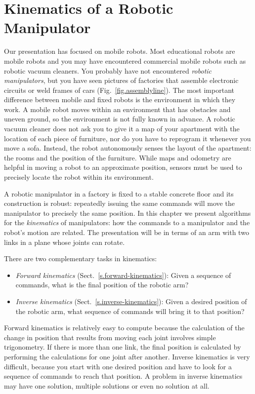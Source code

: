 
\chapter{Kinematics of a Robotic Manipulator}\label{ch.kinematics}

Our presentation has focused on mobile robots. Most educational robots are mobile robots and you may have encountered commercial mobile robots such as robotic vacuum cleaners. You probably have not encountered \emph{robotic manipulators}, but you have seen pictures of factories that assemble electronic circuits or weld frames of cars (Fig.~\ref{fig.assemblyline}). The most important difference between mobile and fixed robots is the environment in which they work. A mobile robot moves within an environment that has obstacles and uneven ground, so the environment is not fully known in advance. A robotic vacuum cleaner does not ask you to give it a map of your apartment with the location of each piece of furniture, nor do you have to reprogram it whenever you move a sofa. Instead, the robot autonomously senses the layout of the apartment: the rooms and the position of the furniture. While maps and odometry are helpful in moving a robot to an approximate position, sensors must be used to precisely locate the robot within its environment.

A robotic manipulator in a factory is fixed to a stable concrete floor and its construction is robust: repeatedly issuing the same commands will move the manipulator to precisely the same position. In this chapter we present algorithms for the \emph{kinematics} of manipulators: how the commands to a manipulator and the robot's motion are related. The presentation will be in terms of an arm with two links in a plane whose joints can rotate.

There are two complementary tasks in kinematics:
\begin{itemize}
\item \textit{Forward kinematics} (Sect.~\ref{s.forward-kinematics}): Given a sequence of commands, what is the final position of the robotic arm?
\item \textit{Inverse kinematics}  (Sect.~\ref{s.inverse-kinematics}): Given a desired position of the robotic arm, what sequence of commands will bring it to that position?
\end{itemize}

Forward kinematics is relatively easy to compute because the calculation of the change in position that results from moving each joint involves simple trigonometry. If there is more than one link, the final position is calculated by performing the calculations for one joint after another. Inverse kinematics is very difficult, because you start with one desired position and have to look for a sequence of commands to reach that position. A problem in inverse kinematics may have one solution, multiple solutions or even no solution at all.

